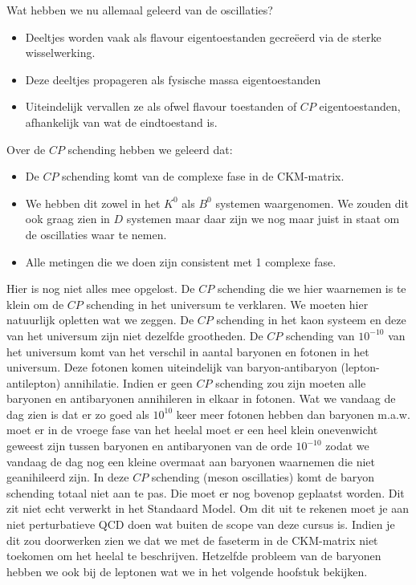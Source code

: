 \documentclass[../main.tex]{subfiles}
\begin{document}
Wat hebben we nu allemaal geleerd van de oscillaties?
\begin{itemize}
    \item Deeltjes worden vaak als flavour eigentoestanden gecreëerd via de sterke wisselwerking.
    \item Deze deeltjes propageren als fysische massa eigentoestanden
    \item Uiteindelijk vervallen ze als ofwel flavour toestanden of $CP$ eigentoestanden, afhankelijk van wat de eindtoestand is.
\end{itemize}
Over de $CP$ schending hebben we geleerd dat:
\begin{itemize}
    \item De $CP$ schending komt van de complexe fase in de CKM-matrix.
    \item We hebben dit zowel in het $K^0$ als $B^0$ systemen waargenomen. We zouden dit ook graag zien in $D$ systemen maar daar zijn we nog maar juist in staat om de oscillaties waar te nemen.
    \item Alle metingen die we doen zijn consistent met 1 complexe fase.
\end{itemize}
Hier is nog niet alles mee opgelost. De $CP$ schending die we hier waarnemen is te klein om de $CP$ schending in het universum te verklaren. We moeten hier natuurlijk opletten wat we zeggen. De $CP$ schending in het kaon systeem en deze van het universum zijn niet dezelfde grootheden. De $CP$ schending van $10^{-10}$ van het universum komt van het verschil in aantal baryonen en fotonen in het universum. Deze fotonen komen uiteindelijk van baryon-antibaryon (lepton-antilepton) annihilatie. Indien er geen $CP$ schending zou zijn moeten alle baryonen en antibaryonen annihileren in elkaar in fotonen. Wat we vandaag de dag zien is dat er zo goed als $10^{10}$ keer meer fotonen hebben dan baryonen m.a.w. moet er in de vroege fase van het heelal moet er een heel klein onevenwicht geweest zijn tussen baryonen en antibaryonen van de orde $10^{-10}$ zodat we vandaag de dag nog een kleine overmaat aan baryonen waarnemen die niet geanihileerd zijn. In deze $CP$ schending (meson oscillaties) komt de baryon schending totaal niet aan te pas. Die moet er nog bovenop geplaatst worden. Dit zit niet echt verwerkt in het Standaard Model. Om dit uit te rekenen moet je aan niet perturbatieve QCD doen wat buiten de scope van deze cursus is. Indien je dit zou doorwerken zien we dat we met de faseterm in de CKM-matrix niet toekomen om het heelal te beschrijven. Hetzelfde probleem van de baryonen hebben we ook bij de leptonen wat we in het volgende hoofstuk bekijken.
\end{document}
